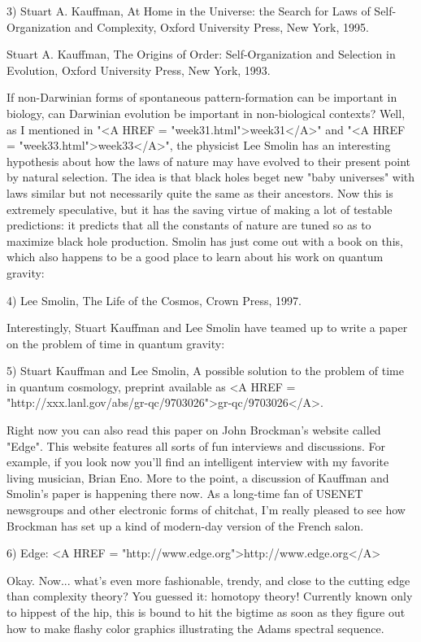 3) Stuart A. Kauffman, At Home in the Universe: the Search for Laws of
Self-Organization and Complexity, Oxford University Press, New York,
1995.

Stuart A. Kauffman, The Origins of Order: Self-Organization and
Selection in Evolution, Oxford University Press, New York, 1993.


If non-Darwinian forms of spontaneous pattern-formation can be important
in biology, can Darwinian evolution be important in non-biological
contexts?  Well, as I mentioned in "<A HREF = "week31.html">week31</A>" and "<A HREF = "week33.html">week33</A>", the physicist
Lee Smolin has an interesting hypothesis about how the laws of nature
may have evolved to their present point by natural selection.  The idea
is that black holes beget new "baby universes" with laws similar but not
necessarily quite the same as their ancestors.  Now this is extremely
speculative, but it has the saving virtue of making a lot of testable
predictions: it predicts that all the constants of nature are tuned so
as to maximize black hole production.  Smolin has just come out with
a book on this, which also happens to be a good place to learn about
his work on quantum gravity:


4) Lee Smolin, The Life of the Cosmos, Crown Press, 1997.


Interestingly, Stuart Kauffman and Lee Smolin have teamed up to
write a paper on the problem of time in quantum gravity:


5) Stuart Kauffman and Lee Smolin, A possible solution to the problem
of time in quantum cosmology, preprint available as <A HREF = "http://xxx.lanl.gov/abs/gr-qc/9703026">gr-qc/9703026</A>.


Right now you can also read this paper on John Brockman's website called
"Edge".  This website features all sorts of fun interviews and
discussions.  For example, if you look now you'll find an intelligent
interview with my favorite living musician, Brian Eno.  More to the point,
a discussion of Kauffman and Smolin's paper is happening there now.
As a long-time fan of USENET newsgroups and other electronic forms of
chitchat, I'm really pleased to see how Brockman has set up a kind of
modern-day version of the French salon.   


6) Edge: <A HREF = "http://www.edge.org">http://www.edge.org</A>


Okay.  Now... what's even more fashionable, trendy, and close to
the cutting edge than complexity theory?  You guessed it: homotopy
theory!  Currently known only to hippest of the hip, this is bound to
hit the bigtime as soon as they figure out how to make flashy color
graphics illustrating the Adams spectral sequence.

